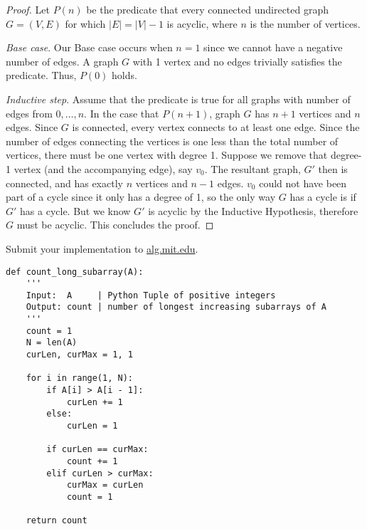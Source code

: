 \documentclass[12pt,twoside]{article}
\begin{document}
\begin{problems}
\newpage
\problem  %
\begin{proof}
Let \(P(n)\) be the predicate that every connected undirected graph \(G=(V,E)\) for which \(|E|=|V|-1\) is acyclic, where \(n\) is the number of vertices.

\textit{Base case}. Our Base case occurs when \(n=1\) since we cannot have a negative number of edges. A graph \(G\) with 1 vertex and no edges trivially satisfies the predicate. Thus, \(P(0)\) holds.

\textit{Inductive step}. Assume that the predicate is true for all graphs with number of edges from \(0,\ldots,n\). In the case that \(P(n+1)\), graph \(G\) has \(n+1\) vertices and \(n\) edges. Since \(G\) is connected, every vertex connects to at least one edge. Since the number of edges connecting the vertices is one less than the total number of vertices, there must be one vertex with degree 1. Suppose we remove that degree-1 vertex (and the accompanying edge), say \(v_0\). The resultant graph, \(G'\) then is connected, and has exactly \(n\) vertices and \(n-1\) edges. \(v_0\) could not have been part of a cycle since it only has a degree of 1, so the only way \(G\) has a cycle is if \(G'\) has a cycle. But we know \(G'\) is acyclic by the Inductive Hypothesis, therefore \(G\) must be acyclic. This concludes the proof.
\end{proof}

\vfill
\problem  %
Submit your implementation to {\small\url{alg.mit.edu}}.

\begin{lstlisting}
def count_long_subarray(A):
    '''
    Input:  A     | Python Tuple of positive integers
    Output: count | number of longest increasing subarrays of A
    '''
    count = 1
    N = len(A)
    curLen, curMax = 1, 1

    for i in range(1, N):
        if A[i] > A[i - 1]:
            curLen += 1
        else:
            curLen = 1

        if curLen == curMax:
            count += 1
        elif curLen > curMax:
            curMax = curLen
            count = 1

    return count
\end{lstlisting}

\end{problems}
\end{document}
